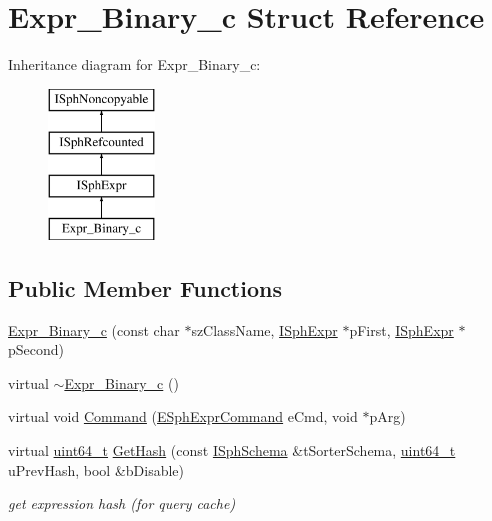 \hypertarget{structExpr__Binary__c}{\section{Expr\-\_\-\-Binary\-\_\-c Struct Reference}
\label{structExpr__Binary__c}
}
Inheritance diagram for Expr\-\_\-\-Binary\-\_\-c\-:\begin{figure}[H]
\begin{center}
\leavevmode
\includegraphics[height=4.000000cm]{structExpr__Binary__c}
\end{center}
\end{figure}
\subsection*{Public Member Functions}
\begin{DoxyCompactItemize}
\item 
\hyperlink{structExpr__Binary__c_ae6b11e9c821d29ce701d673bdc32a847}{Expr\-\_\-\-Binary\-\_\-c} (const char $\ast$sz\-Class\-Name, \hyperlink{structISphExpr}{I\-Sph\-Expr} $\ast$p\-First, \hyperlink{structISphExpr}{I\-Sph\-Expr} $\ast$p\-Second)
\item 
virtual \hyperlink{structExpr__Binary__c_a71919e9c066264594c054f450cf22641}{$\sim$\-Expr\-\_\-\-Binary\-\_\-c} ()
\item 
virtual void \hyperlink{structExpr__Binary__c_a9ab600e1c562049e3a4444416f73dee1}{Command} (\hyperlink{sphinxexpr_8h_a30be184fb07bd80c271360fc6094c818}{E\-Sph\-Expr\-Command} e\-Cmd, void $\ast$p\-Arg)
\item 
virtual \hyperlink{sphinxstd_8h_aaa5d1cd013383c889537491c3cfd9aad}{uint64\-\_\-t} \hyperlink{structExpr__Binary__c_aede461bce9ed3f07d23dcaaf85d44d5d}{Get\-Hash} (const \hyperlink{classISphSchema}{I\-Sph\-Schema} \&t\-Sorter\-Schema, \hyperlink{sphinxstd_8h_aaa5d1cd013383c889537491c3cfd9aad}{uint64\-\_\-t} u\-Prev\-Hash, bool \&b\-Disable)
\begin{DoxyCompactList}\small\item\em get expression hash (for query cache) \end{DoxyCompactList}\end{DoxyCompactItemize}
